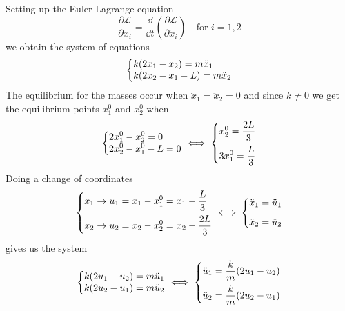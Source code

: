 Setting up the Euler-Lagrange equation 
\begin{equation*}
    \frac{\partial \mathcal{L}}{\partial x_i} = \frac{\dd}{\dd t} \left( \frac{\partial \mathcal{L}}{\partial \dot{x}_i} \right) \quad \text{for } i = 1, 2
\end{equation*}
we obtain the system of equations
\begin{equation*}
    \left\{\begin{array}{@{}>{\displaystyle}l@{}}
        k (2 x_1 - x_2) = m \ddot{x}_1\\
        k(2 x_2 - x_1 - L) = m \ddot{x}_2
    \end{array}\right.
\end{equation*}
The equilibrium for the masses occur when $\ddot{x}_1 = \ddot{x}_2 = 0$ and since $k \neq 0$ we get the equilibrium points $x_1^0$ and $x_2^0$ when
\begin{equation*}
    \left\{\begin{array}{@{}>{\displaystyle}l@{}}
        2 x_1^0 - x_2^0 = 0\\
        2 x_2^0 - x_1^0 - L = 0
    \end{array}\right.
    \iff 
    \left\{\begin{array}{@{}>{\displaystyle}l@{}}
        x_2^0 = \frac{2L}{3}\\[8pt]
        3x_1^0 = \frac{L}{3}
    \end{array}\right.
\end{equation*}
Doing a change of coordinates
\begin{equation*}
    \left\{\begin{array}{@{}>{\displaystyle}l@{}}
        x_1 \to u_1 = x_1 - x_1^0 = x_1 - \frac{L}{3}\\[8pt]
        x_2 \to u_2 = x_2 - x_2^0 = x_2 - \frac{2L}{3}
    \end{array}\right. 
    \iff
    \left\{\begin{array}{@{}>{\displaystyle}l@{}}
        \ddot{x}_1 = \ddot{u}_1 \\[8pt]
        \ddot{x}_2 = \ddot{u}_2 
    \end{array}\right. 
\end{equation*}
gives us the system
\begin{equation*}
    \left\{\begin{array}{@{}>{\displaystyle}l@{}}
        k (2 u_1 - u_2) = m \ddot{u}_1\\
        k(2 u_2 - u_1) = m \ddot{u}_2
    \end{array}\right.
    \iff
    \left\{\begin{array}{@{}>{\displaystyle}l@{}}
        \ddot{u}_1 = \frac{k}{m} (2 u_1 - u_2) \\[8pt]
        \ddot{u}_2 = \frac{k}{m} (2 u_2 - u_1)
    \end{array}\right.
\end{equation*}
